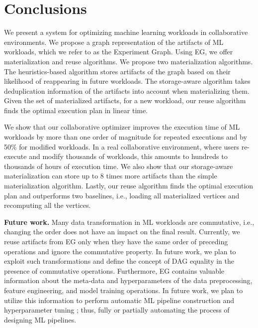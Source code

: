 \section{Conclusions} \label{sec-conclusion}
We present a system for optimizing machine learning workloads in collaborative environments.
We propose a graph representation of the artifacts of ML workloads, which we refer to as the Experiment Graph.
Using EG, we offer materialization and reuse algorithms.
We propose two materialization algorithms.
The heuristics-based algorithm stores artifacts of the graph based on their likelihood of reappearing in future workloads.
The storage-aware algorithm takes deduplication information of the artifacts into account when materializing them.
Given the set of materialized artifacts, for a new workload, our reuse algorithm finds the optimal execution plan in linear time.

We show that our collaborative optimizer improves the execution time of ML workloads by more than one order of magnitude for repeated executions and by 50\% for modified workloads.
In a real collaborative environment, where users re-execute and modify thousands of workloads, this amounts to hundreds to thousands of hours of execution time.
We also show that our storage-aware materialization can store up to 8 times more artifacts than the simple materialization algorithm.
Lastly, our reuse algorithm finds the optimal execution plan and outperforms two baselines, i.e., loading all materialized vertices and recomputing all the vertices.

\textbf{Future work.}
Many data transformation in ML workloads are commutative, i.e., changing the order does not have an impact on the final result.
Currently, we reuse artifacts from EG only when they have the same order of preceding operations and ignore the commutative property.
In future work, we plan to exploit such transformations and define the concept of DAG equality in the presence of commutative operations.
Furthermore, EG contains valuable information about the meta-data and hyperparameters of the data preprocessing, feature engineering, and model training operations.
In future work, we plan to utilize this information to perform automatic ML pipeline construction and hyperparameter tuning \cite{Feurer15, thornton2013auto, shang2019democratizing}; thus, fully or partially automating the process of designing ML pipelines.
